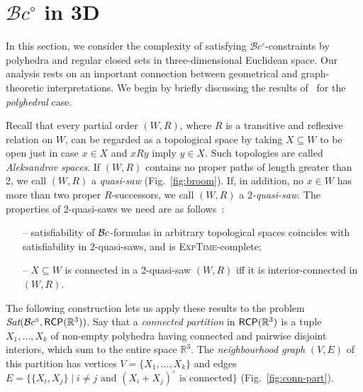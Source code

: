 \documentclass{article}
\newcommand{\ExpTime}{\textsc{ExpTime}}
\newcommand{\Sat}{\textit{Sat}}
\newcommand{\cBci}{\ensuremath{\mathcal{B}c^\circ}}
\newcommand{\R}{\mathbb{R}}
\newcommand{\RCP}{{\sf RCP}}
\newcommand{\ti}[2][]{{#2}^{\circ_{#1}}}
\begin{document}
\section{\cBci{} in 3D}\label{sec:3d}

In this section, we consider the complexity of satisfying
\cBci-constraints by polyhedra and regular closed sets in
three-dimensional Euclidean space. Our analysis rests on an important
connection between geometrical and graph-theoretic interpretations. We
begin by briefly discussing the results of~\cite{ijcai:kp-hwz10} for
the {\em polyhedral} case.

Recall that every partial order $(W,R)$, where $R$ is a transitive and
reflexive relation on $W$, can be regarded as a topological space by
taking $X \subseteq W$ to be open just in case $x \in X$ and $xRy$
imply $y\in X$. Such topologies are called \emph{Aleksandrov spaces}.
If $(W,R)$ contains no proper paths of length greater than 2, we call
$(W,R)$ a \emph{quasi-saw} (Fig.~\ref{fig:broom}).  If, in
addition, no $x \in W$ has more than two proper $R$-successors, we
call $(W,R)$ a \emph{$2$-quasi-saw}.  The properties of 2-quasi-saws
we need are as follows~\cite{ijcai:kp-hwz10}:
\begin{itemize}\itemsep=0pt
\item[--] satisfiability of $\mathcal{B}c$-formulas in arbitrary topological
  spaces coincides with satisfiability in 2-quasi-saws, and is
  \ExpTime-complete;

\item[--] $X \subseteq W$ is connected in a 2-quasi-saw $(W,R)$ iff it is interior-connected in $(W,R)$.
\end{itemize}
The following construction lets us apply these results to the problem
$\Sat(\cBci,\RCP(\R^3))$.  Say that a \emph{connected partition} in
$\RCP(\R^3)$ is a tuple $X_1,\dots,X_k$ of non-empty polyhedra having
connected and pairwise disjoint interiors, which sum to the entire
space $\R^3$. The \emph{neighbourhood graph} $(V,E)$ of this partition
has vertices $V = \{X_1, \ldots, X_k\}$ and edges $E = \{\{X_i, X_j\}
\mid i \ne j \text{ and } \ti{(X_i + X_j)} \text{ is connected}\}$
(Fig.~\ref{fig:conn-part}).
\end{document}
